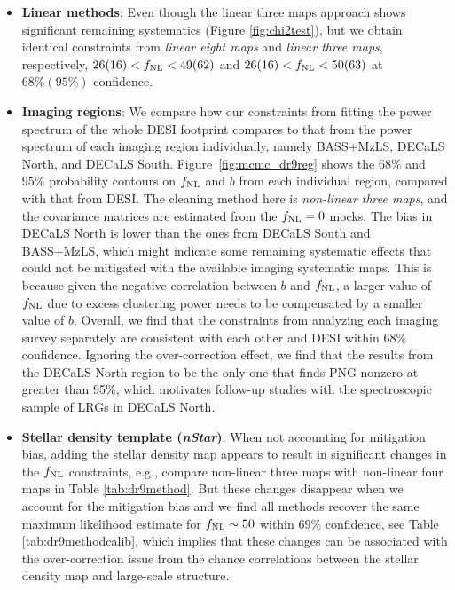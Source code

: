 \begin{itemize}[itemindent=*]

\item \textbf{Linear methods}: Even though the linear three maps approach shows significant remaining systematics (Figure \ref{fig:chi2test}), but we obtain identical constraints from \textit{linear eight maps} and \textit{linear three maps}, respectively, $26(16)<f_{\rm NL}<49(62)$ and $26(16)<f_{\rm NL}<50(63)$ at $68\%(95\%)$ confidence. 

\item \textbf{Imaging regions}: We compare how our constraints from fitting the power spectrum of the whole DESI footprint compares to that from the power spectrum of each imaging region individually, namely BASS+MzLS, DECaLS North, and DECaLS South. Figure~\ref{fig:mcmc_dr9reg} shows the $68\%$ and $95\%$ probability contours on $f_{\rm NL}$ and $b$ from each individual region, compared with that from DESI. The cleaning method here is \textit{non-linear three maps}, and the covariance matrices are estimated from the $f_{\rm NL}=0$ mocks. The bias in DECaLS North is lower than the ones from DECaLS South and BASS+MzLS, which might indicate some remaining systematic effects that could not be mitigated with the available imaging systematic maps. This is because given the negative correlation between $b$ and $f_{\rm NL}$, a larger value of $f_{\rm NL}$ due to excess clustering power needs to be compensated by a smaller value of $b$. Overall, we find that the constraints from analyzing each imaging survey separately are consistent with each other and DESI within $68\%$ confidence. Ignoring the over-correction effect, we find that the results from the DECaLS North region to be the only one that finds PNG nonzero at greater than 95\%, which motivates follow-up studies with the spectroscopic sample of LRGs in DECaLS North. %


\item \textbf{Stellar density template (\textit{nStar})}: When not accounting for mitigation bias, adding the stellar density map appears to result in significant changes in the $f_{\rm NL}$ constraints, e.g., compare non-linear three maps with non-linear four maps in Table \ref{tab:dr9method}. But these changes disappear when we account for the mitigation bias and we find all methods recover the same maximum likelihood estimate for $f_{\rm NL} \sim 50$ within $69\%$ confidence, see Table \ref{tab:dr9methodcalib}, which implies that these changes can be associated with the over-correction issue from the chance correlations between the stellar density map and large-scale structure.


\end{itemize}
